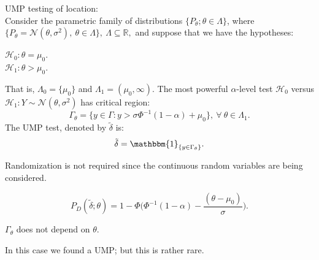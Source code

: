 \documentclass[a4paper,english,12pt]{article}
\begin{document}
\begin{exmp}{UMP testing of location:}\\
Consider the parametric family of distributions $\{P_\theta;\theta \in \Lambda\}$, where\\ $\{P_\theta= \mathcal{N}(\theta,\sigma^2),~\theta \in \Lambda\}, ~ \Lambda \subseteq \mathbb{R},$ and suppose that we have the hypotheses:
\begin{center}
$\mathcal{H}_0 : \theta = \mu_0.$\\
$\mathcal{H}_1 : \theta > \mu_0.$	
\end{center}
	
That is, $\Lambda_0 = \{\mu_0\}$ and $\Lambda_1 = (\mu_0,\infty)$. The most powerful $\alpha$-level test $\mathcal{H}_0$ versus $\mathcal{H}_1 : Y \sim \mathcal{N}(\theta,\sigma^2)$ has critical region:
\begin{equation}
\Gamma_\theta = \{y \in \Gamma: y > \sigma \Phi^{-1}(1 - \alpha) + \mu_0 \}, ~ \forall ~ \theta \in \Lambda_1.
\end{equation}
The UMP test, denoted by $\tilde{\delta}$ is:
\begin{equation}
\tilde{\delta} = \mathbbm{1}_{\{y \in \Gamma_\theta\}}.
\end{equation}

\begin{rem}
Randomization is not required since the continuous random variables are being considered.	
\end{rem}		
\begin{equation*}
P_D(\tilde{\delta}; \theta) = 1 - \Phi\Big(\Phi^{-1}(1 - \alpha) - \dfrac{(\theta - \mu_0)}{\sigma}\Big).
\end{equation*}

\begin{note}
	$\Gamma_\theta$ does not depend on $\theta$.	
\end{note}	
\begin{note}
	In this case we found a UMP; but this is rather rare.	
\end{note}	
\end{exmp}		 
\end{document}
